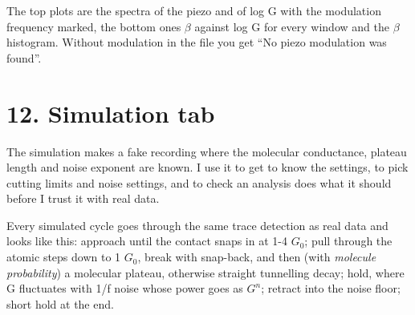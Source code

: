 \documentclass[
  11pt,
  a4paper,
]{article}
\begin{document}
The top plots are the spectra of the piezo and of log G with the
modulation frequency marked, the bottom ones $\beta$ against log G for
every window and the $\beta$ histogram. Without modulation in the file
you get ``No piezo modulation was found''.

\hypertarget{simulation-tab}{%
\section{12. Simulation tab}\label{simulation-tab}}

The simulation makes a fake recording where the molecular conductance,
plateau length and noise exponent are known. I use it to get to know the
settings, to pick cutting limits and noise settings, and to check an
analysis does what it should before I trust it with real data.

Every simulated cycle goes through the same trace detection as real data
and looks like this: approach until the contact snaps in at 1-4 $G_0$;
pull through the atomic steps down to 1 $G_0$, break with snap-back, and
then (with \emph{molecule probability}) a molecular plateau, otherwise
straight tunnelling decay; hold, where G fluctuates with 1/f noise whose
power goes as $G^{n}$; retract into the noise floor; short hold at the
end.
\end{document}
